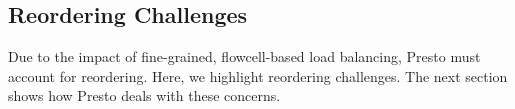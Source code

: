 
\subsection{Reordering Challenges}
Due to the impact of fine-grained, flowcell-based load balancing, Presto must account for reordering. Here, we 
highlight reordering challenges. The next section shows how Presto deals with these concerns.



